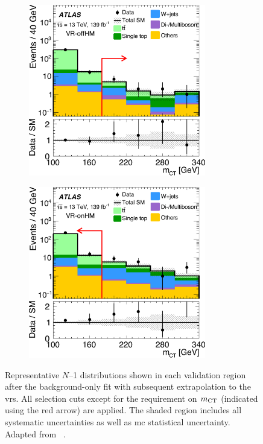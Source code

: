 \begin{figure}
	\begin{subfigure}[b]{0.5\linewidth}
		\centering\includegraphics[width=0.85\textwidth]{fig_03f_yellow}
	\end{subfigure}\hfill
	\begin{subfigure}[b]{0.5\linewidth}
		\centering\includegraphics[width=0.85\textwidth]{fig_03e_yellow}
	\end{subfigure}\hfill

	\caption{Representative $N$--1 distributions shown in each validation region after the background-only fit with subsequent extrapolation to the \glspl{vr}. All selection cuts except for the requirement on $m_{\textrm{CT}}$ (indicated using the red arrow) are applied. The shaded region includes all systematic uncertainties as well as \gls{mc} statistical uncertainty. Adapted from ~\cite{SUSY-2019-08}.}
	\label{fig:VR_distributions_postfit}
\end{figure}

